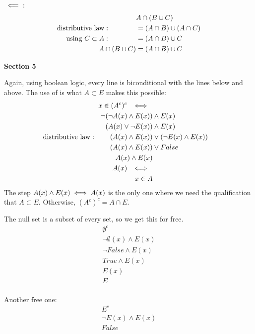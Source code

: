\documentclass{article}
\newcommand{\nl}[0]{\newline}
\newcommand{\limp}[1][5]{\kern#1px \Longleftarrow \kern#1px}
\newcommand{\cimp}[1][5]{\kern#1px \iff \kern#1px}
\begin{document}
\begin{flushleft}
$\limp$: \nl
$$\begin{aligned}
&A \cap (B \cup C) \\
\text{distributive law} : \kern40px &= (A \cap B) \cup (A \cap C) \\
\text{using } C \subset A :\kern40px &= (A \cap B) \cup C \\
A \cap (B \cup C) &= (A \cap B) \cup C\\
\end{aligned}$$

\centerline{\textbf{Section 5}}

 \nl
Again, using boolean logic, every line is biconditional with the lines below and above. The use of is what $A \subset E$ makes this possible:
$$\begin{aligned}
x \in (A^c)^c \cimp\\
\neg(\neg A(x) \wedge E(x)) &\wedge E(x)\\
(A(x) \vee \neg E(x)) &\wedge E(x) \\
\text{distributive law} : \kern 20px (A(x) \wedge E(x)) &\vee (\neg E(x) \wedge E(x)) \\
(A(x) \wedge E(x)) &\vee False \\
A(x) \wedge E(x) \\
A(x) \cimp \\
x \in A \\
\end{aligned}$$
The step $A(x) \wedge E(x) \cimp[0] A(x)$ is the only one where we need the qualification that $A \subset E$. Otherwise, $(A^c)^c = A \cap E$. \nl

 \nl
The null set is a subset of every set, so we get this for free.
$$\begin{gathered}
\emptyset^c \\
\neg \emptyset(x) \wedge E(x)\\
\neg False \wedge E(x)\\
True \wedge E(x) \\
E(x) \\
E\\
\end{gathered}$$

 \nl
Another free one:
$$\begin{gathered}
E^c \\
\neg E(x) \wedge E(x) \\
False\\
\end{gathered}$$


\end{flushleft}
\end{document}
